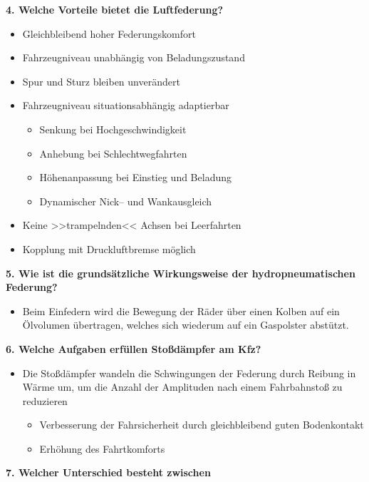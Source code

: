 \textbf{4. Welche Vorteile bietet die Luftfederung?}

\begin{itemize}
\item
  Gleichbleibend hoher Federungskomfort
\item
  Fahrzeugniveau unabhängig von Beladungszustand
\item
  Spur und Sturz bleiben unverändert
\item
  Fahrzeugniveau situationsabhängig adaptierbar

  \begin{itemize}
  \item
    Senkung bei Hochgeschwindigkeit
  \item
    Anhebung bei Schlechtwegfahrten
  \item
    Höhenanpassung bei Einstieg und Beladung
  \item
    Dynamischer Nick-- und Wankausgleich
  \end{itemize}
\item
  Keine >>trampelnden<< Achsen bei Leerfahrten
\item
  Kopplung mit Druckluftbremse möglich
\end{itemize}

\textbf{5. Wie ist die grundsätzliche Wirkungsweise der
hydropneumatischen Federung?}

\begin{itemize}
\item
  Beim Einfedern wird die Bewegung der Räder über einen Kolben auf ein
  Ölvolumen übertragen, welches sich wiederum auf ein Gaspolster
  abstützt.
\end{itemize}

\textbf{6. Welche Aufgaben erfüllen Stoßdämpfer am Kfz?}

\begin{itemize}
\item
  Die Stoßdämpfer wandeln die Schwingungen der Federung durch Reibung in
  Wärme um, um die Anzahl der Amplituden nach einem Fahrbahnstoß zu
  reduzieren

  \begin{itemize}
  \item
    Verbesserung der Fahrsicherheit durch gleichbleibend guten
    Bodenkontakt
  \item
    Erhöhung des Fahrtkomforts
  \end{itemize}
\end{itemize}

\textbf{7. Welcher Unterschied besteht zwischen}

